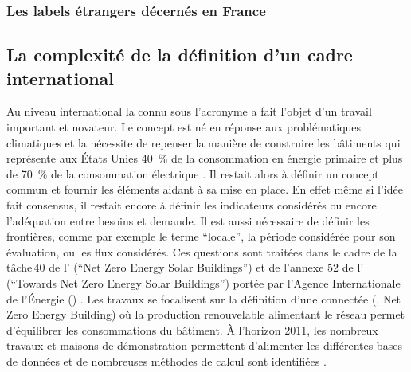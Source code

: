 \subsubsection{Les labels étrangers décernés en France} %
\label{ssub:les_labels_etrangers_decernes_en_france}





\subsection{La complexité de la définition d’un cadre international} %
\label{sub:la_definition_d_un_cadre_international}
Au niveau international la  connu sous l’acronyme  a fait l’objet d’un
travail important et novateur.
Le concept est né en réponse aux problématiques climatiques et la nécessite
de repenser la manière de construire les bâtiments qui représente aux États Unies
\SI{40}{\percent} de la consommation en énergie primaire et plus de \SI{70}{\percent}
de la consommation électrique \parencite{Torcellini2006a}. Il
restait alors à définir un concept commun et fournir les éléments aidant à sa mise en
place. En effet même si l’idée fait consensus, il restait encore à définir les indicateurs
considérés ou encore l’adéquation entre besoins et demande.
Il est aussi nécessaire de définir les frontières, comme par exemple le terme \enquote{locale},
la période considérée pour son évaluation, ou les flux considérés. Ces questions sont traitées
dans le cadre de la tâche\,40 de l’ (\enquote{Net Zero Energy Solar Buildings}) et de l’annexe $52$ de
l’ (\enquote{Towards Net Zero Energy Solar Buildings}) portée par l’Agence Internationale
de l’Énergie () . Les travaux se focalisent
sur la définition d’une  connectée (, Net Zero Energy Building) où
la production renouvelable alimentant le réseau permet d’équilibrer les consommations du bâtiment.
À l’horizon 2011, les nombreux travaux et maisons de démonstration permettent d’alimenter
les différentes bases de données et de nombreuses méthodes de calcul sont identifiées
\parencite{Marszal2011971}.


